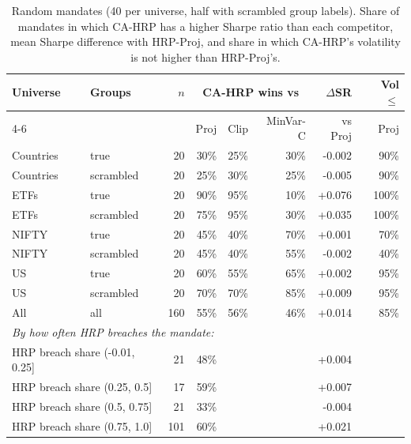 \begin{table}[!htbp]\centering\small
\caption{Random mandates (40 per universe, half with scrambled group labels). Share of mandates in which CA-HRP has a higher Sharpe ratio than each competitor, mean Sharpe difference with HRP-Proj, and share in which CA-HRP's volatility is not higher than HRP-Proj's.}\label{tab:random}
\setlength{\tabcolsep}{3.5pt}\begin{tabular}{ll r rrr r r}\toprule
Universe & Groups & $n$ & \multicolumn{3}{c}{CA-HRP wins vs} & $\Delta$SR & Vol $\le$\\
\cmidrule(lr){4-6}
 & & & Proj & Clip & MinVar-C & vs Proj & Proj\\\midrule
Countries & true & 20 & 30\% & 25\% & 30\% & -0.002 & 90\%\\
Countries & scrambled & 20 & 25\% & 30\% & 25\% & -0.005 & 90\%\\
ETFs & true & 20 & 90\% & 95\% & 10\% & +0.076 & 100\%\\
ETFs & scrambled & 20 & 75\% & 95\% & 30\% & +0.035 & 100\%\\
NIFTY & true & 20 & 45\% & 40\% & 70\% & +0.001 & 70\%\\
NIFTY & scrambled & 20 & 45\% & 40\% & 55\% & -0.002 & 40\%\\
US & true & 20 & 60\% & 55\% & 65\% & +0.002 & 95\%\\
US & scrambled & 20 & 70\% & 70\% & 85\% & +0.009 & 95\%\\
All & all & 160 & 55\% & 56\% & 46\% & +0.014 & 85\%\\
\midrule
\multicolumn{8}{l}{\emph{By how often HRP breaches the mandate:}}\\
\multicolumn{2}{l}{HRP breach share (-0.01, 0.25]} & 21 & 48\% & & & +0.004 & \\
\multicolumn{2}{l}{HRP breach share (0.25, 0.5]} & 17 & 59\% & & & +0.007 & \\
\multicolumn{2}{l}{HRP breach share (0.5, 0.75]} & 21 & 33\% & & & -0.004 & \\
\multicolumn{2}{l}{HRP breach share (0.75, 1.0]} & 101 & 60\% & & & +0.021 & \\
\bottomrule\end{tabular}\end{table}